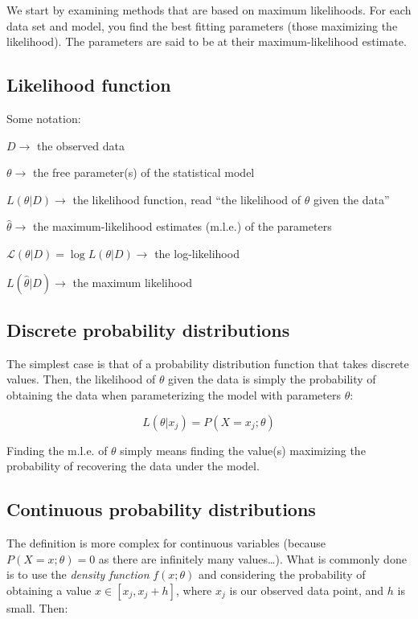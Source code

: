 \documentclass[
  letterpaper,
  DIV=11,
  numbers=noendperiod]{scrreprt}
\begin{document}
We start by examining methods that are based on maximum likelihoods. For
each data set and model, you find the best fitting parameters (those
maximizing the likelihood). The parameters are said to be at their
maximum-likelihood estimate.

\hypertarget{likelihood-function}{%
\subsection{Likelihood function}\label{likelihood-function}}

Some notation:

\(D \to\) the observed data

\(\theta \to\) the free parameter(s) of the statistical model

\(L(\theta \vert D) \to\) the likelihood function, read ``the likelihood
of \(\theta\) given the data''

\(\hat{\theta} \to\) the maximum-likelihood estimates (m.l.e.) of the
parameters

\(\mathcal L(\theta \vert D) = \log L(\theta \vert D) \to\) the
log-likelihood

\(L(\hat{\theta} \vert D) \to\) the maximum likelihood

\hypertarget{discrete-probability-distributions-1}{%
\subsection{Discrete probability
distributions}\label{discrete-probability-distributions-1}}

The simplest case is that of a probability distribution function that
takes discrete values. Then, the likelihood of \(\theta\) given the data
is simply the probability of obtaining the data when parameterizing the
model with parameters \(\theta\):

\[L(\theta \vert x_j) = P(X = x_j; \theta)\]

Finding the m.l.e. of \(\theta\) simply means finding the value(s)
maximizing the probability of recovering the data under the model.

\hypertarget{continuous-probability-distributions-1}{%
\subsection{Continuous probability
distributions}\label{continuous-probability-distributions-1}}

The definition is more complex for continuous variables (because
\(P(X = x; \theta) = 0\) as there are infinitely many values\ldots).
What is commonly done is to use the \emph{density function}
\(f(x; \theta)\) and considering the probability of obtaining a value
\(x \in [x_j, x_j + h]\), where \(x_j\) is our observed data point, and
\(h\) is small. Then:
\end{document}
